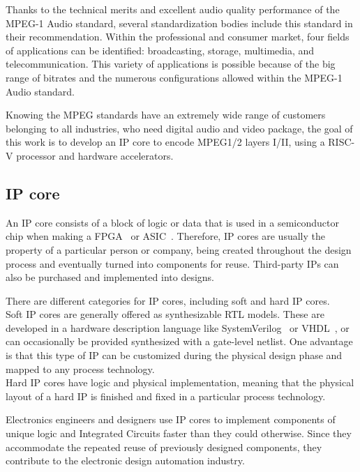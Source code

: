 Thanks to the technical merits and excellent audio quality performance of the MPEG-1 Audio standard, several standardization bodies include this standard in their recommendation.
Within the professional and consumer market, four fields of applications can be identified: broadcasting, storage, multimedia, and telecommunication. This variety of applications is possible because of the big range of bitrates and the numerous configurations allowed within the MPEG-1 Audio standard. 

Knowing the MPEG standards have an extremely wide range of customers belonging to all industries, who need digital audio and video package, the goal of this work is to develop an IP core to encode MPEG1/2 layers I/II, using a RISC-V processor and hardware accelerators.

\subsection{IP core}

An IP core consists of a block of logic or data that is used in a semiconductor chip when making a FPGA~\cite{fpga} or ASIC~\cite{asic}.
Therefore, IP cores are usually the property of a particular person or company, being created throughout the design process and eventually turned into components for reuse. Third-party IPs can also be purchased and implemented into designs. 

There are different categories for IP cores, including soft and hard IP cores.\\
Soft IP cores are generally offered as synthesizable RTL models. These are developed in a hardware description language like SystemVerilog~\cite{ieee:systemVerilog} or VHDL~\cite{ieee:vhdl}, or can occasionally be provided synthesized with a gate-level netlist. One advantage is that this type of IP can be customized during the physical design phase and mapped to any process technology.\\
Hard IP cores have logic and physical implementation, meaning that the physical layout of a hard IP is finished and fixed in a particular process technology.

Electronics engineers and designers use IP cores to implement components of unique logic and Integrated Circuits faster than they could otherwise. Since they accommodate the repeated reuse of previously designed components, they contribute to the electronic design automation industry.

